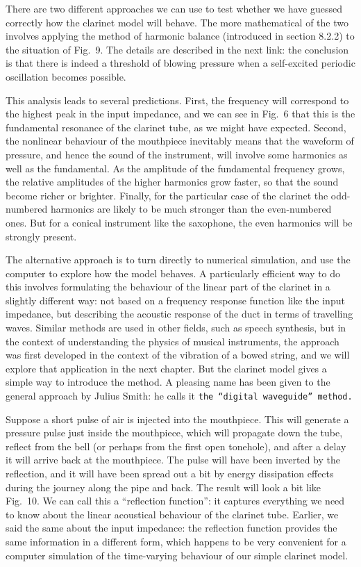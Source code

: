  There are two different approaches we can use to test whether we have guessed 
  correctly how the clarinet model will behave. The more mathematical of the 
  two involves applying the method of harmonic balance (introduced in section 
  8.2.2) to the situation of Fig.\ 9. The details are described in the next 
  link: the conclusion is that there is indeed a threshold of blowing pressure 
  when a self-excited periodic oscillation becomes possible. 

  This analysis leads to several predictions. First, the frequency will 
  correspond to the highest peak in the input impedance, and we can see in 
  Fig.\ 6 that this is the fundamental resonance of the clarinet tube, as we 
  might have expected. Second, the nonlinear behaviour of the mouthpiece 
  inevitably means that the waveform of pressure, and hence the sound of the 
  instrument, will involve some harmonics as well as the fundamental. As the 
  amplitude of the fundamental frequency grows, the relative amplitudes of the 
  higher harmonics grow faster, so that the sound become richer or brighter. 
  Finally, for the particular case of the clarinet the odd-numbered harmonics 
  are likely to be much stronger than the even-numbered ones. But for a conical 
  instrument like the saxophone, the even harmonics will be strongly present. 

  The alternative approach is to turn directly to numerical simulation, and use 
  the computer to explore how the model behaves. A particularly efficient way 
  to do this involves formulating the behaviour of the linear part of the 
  clarinet in a slightly different way: not based on a frequency response 
  function like the input impedance, but describing the acoustic response of 
  the duct in terms of travelling waves. Similar methods are used in other 
  fields, such as speech synthesis, but in the context of understanding the 
  physics of musical instruments, the approach was first developed in the 
  context of the vibration of a bowed string, and we will explore that 
  application in the next chapter. But the clarinet model gives a simple way to 
  introduce the method. A pleasing name has been given to the general approach 
  by Julius Smith: he calls it \tt{}the “digital waveguide” method\rm{}. 

  Suppose a short pulse of air is injected into the mouthpiece. This will 
  generate a pressure pulse just inside the mouthpiece, which will propagate 
  down the tube, reflect from the bell (or perhaps from the first open 
  tonehole), and after a delay it will arrive back at the mouthpiece. The pulse 
  will have been inverted by the reflection, and it will have been spread out a 
  bit by energy dissipation effects during the journey along the pipe and back. 
  The result will look a bit like Fig.\ 10. We can call this a “reflection 
  function”: it captures everything we need to know about the linear acoustical 
  behaviour of the clarinet tube. Earlier, we said the same about the input 
  impedance: the reflection function provides the same information in a 
  different form, which happens to be very convenient for a computer simulation 
  of the time-varying behaviour of our simple clarinet model. 

